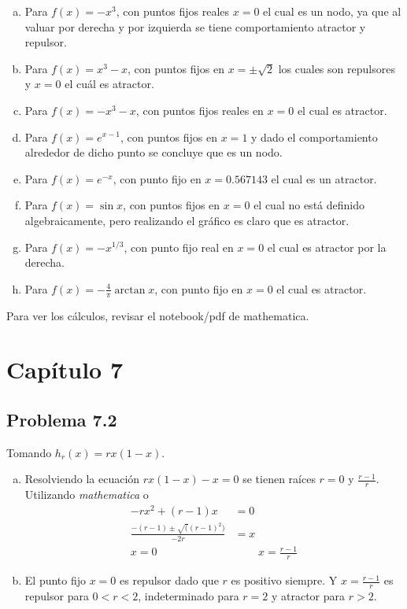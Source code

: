 \documentclass[conference]{IEEEtran}
\begin{document}
\begin{enumerate}[a)]
	\item Para $f(x) = -x^3$, con puntos fijos reales $x = 0$ el cual es un nodo, ya que al valuar por derecha y por izquierda se tiene comportamiento atractor y repulsor.
	\item Para $f(x) = x^3 - x$, con puntos fijos en $x = \pm \sqrt{2}$ los cuales son repulsores y $x = 0$ el cuál es atractor.
	\item Para $f(x) = -x^3 - x$, con puntos fijos reales en $x = 0$ el cual es atractor.
	\item Para $f(x) = e^{x-1}$, con puntos fijos en $x = 1$ y dado el comportamiento alrededor de dicho punto se concluye que es un nodo.
	\item Para $f(x) = e^{-x}$, con punto fijo en $x = 0.567143$ el cual es un atractor.
	\item Para $f(x) = \sin{x}$, con puntos fijos en $x = 0$ el cual no está definido algebraicamente, pero realizando el gráfico es claro que es atractor.
	\item Para $f(x) = -x^{1/3}$, con punto fijo real en $x = 0$ el cual es atractor por la derecha.
	\item Para $f(x) = -\frac{4}{\pi} \arctan{x}$, con punto fijo en $x = 0$ el cual es atractor.
\end{enumerate}

Para ver los cálculos, revisar el notebook/pdf de mathematica.





\section{Capítulo 7}

\subsection{Problema 7.2}
Tomando $h_r (x) = rx(1-x)$.
\begin{enumerate}[a)]
	\item Resolviendo la ecuación $rx(1-x) - x = 0$ se tienen raíces $r = 0$ y $\frac{r-1}{r}$. Utilizando \textit{mathematica} o 
		\begin{align*}
			-rx^2 + (r-1)x &= 0 \\
			\frac{-(r-1)\pm \sqrt((r-1)^2)}{-2r} &= x \\
			x = 0 \qquad &\, \qquad x = \frac{r-1}{r} 
		\end{align*}
	\item El punto fijo $x = 0$ es repulsor dado que $r$ es positivo siempre. Y $x = \frac{r-1}{r}$ es repulsor para $0 < r < 2$, indeterminado para $r = 2$ y atractor para $r > 2$.
\end{enumerate}
\end{document}
